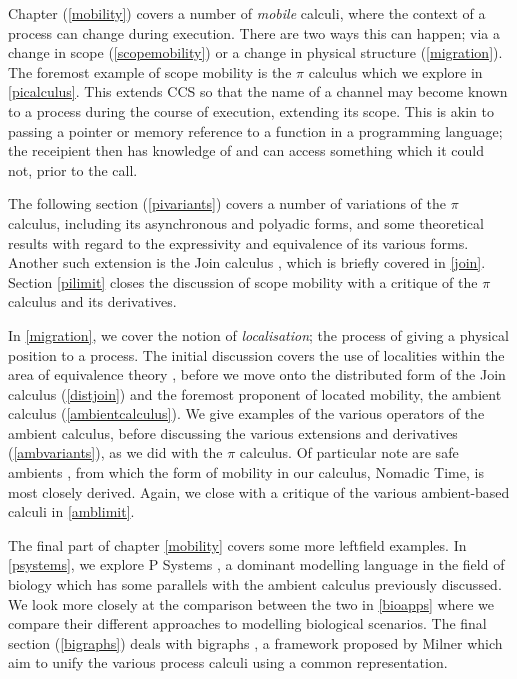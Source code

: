 Chapter (\ref{mobility}) covers a number of \emph{mobile} calculi,
where the context of a process can change during execution.  There are
two ways this can happen; via a change in scope (\ref{scopemobility})
or a change in physical structure (\ref{migration}).  The foremost
example of scope mobility is the $\pi$ calculus \cite{milner:pi} which
we explore in \ref{picalculus}.  This extends CCS so that the name of
a channel may become known to a process during the course of
execution, extending its scope.  This is akin to passing a pointer or
memory reference to a function in a programming language; the
receipient then has knowledge of and can access something which it
could not, prior to the call.

The following section (\ref{pivariants}) covers a number of variations
of the $\pi$ calculus, including its asynchronous and polyadic forms,
and some theoretical results with regard to the expressivity and
equivalence of its various forms.  Another such extension is the Join
calculus \cite{join}, which is briefly covered in \ref{join}.  Section
\ref{pilimit} closes the discussion of scope mobility with a critique
of the $\pi$ calculus and its derivatives.

In \ref{migration}, we cover the notion of \emph{localisation}; the
process of giving a physical position to a process.  The initial
discussion covers the use of localities within the area of equivalence
theory \cite{obslocal}, before we move onto the distributed form of
the Join calculus \cite{djoin} (\ref{distjoin}) and the foremost
proponent of located mobility, the ambient calculus \cite{amb}
(\ref{ambientcalculus}).  We give examples of the various operators of
the ambient calculus, before discussing the various extensions and
derivatives (\ref{ambvariants}), as we did with the $\pi$ calculus.
Of particular note are safe ambients \cite{sangiorgi:mobsafeambients},
from which the form of mobility in our calculus, Nomadic Time, is most
closely derived.  Again, we close with a critique of the various
ambient-based calculi in \ref{amblimit}.

The final part of chapter \ref{mobility} covers some more leftfield
examples.  In \ref{psystems}, we explore P Systems
\cite{membranecomp}, a dominant modelling language in the field of
biology which has some parallels with the ambient calculus previously
discussed.  We look more closely at the comparison between the two in
\ref{bioapps} where we compare their different approaches to modelling
biological scenarios.  The final section (\ref{bigraphs}) deals with
bigraphs \cite{bigraph1}, a framework proposed by Milner which aim to
unify the various process calculi using a common representation.

